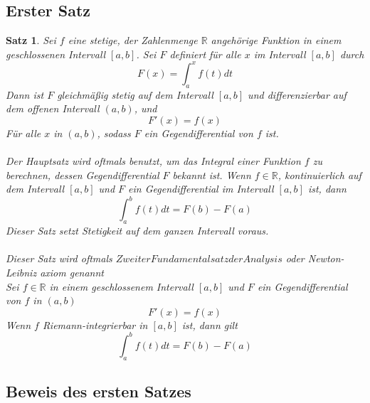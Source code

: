 \documentclass[fontsize=12pt,paper=a4,DIV12,cleardoublepage=empty, 
liststotoc,idxtotoc,bibtotoc]{article}
\newcommand{\RR}{\mathbb{R}}
\theoremstyle{plain}
\newtheorem{satz}{Satz}[subsection]
\theoremstyle{definition}
\begin{document}
	\subsection{Erster Satz}
	\begin{satz}
		Sei $f$ eine stetige, der Zahlenmenge $\RR$ angehörige Funktion in einem geschlossenen Intervall $[a, b]$. Sei $F$ definiert für alle $x$ im Intervall $[a, b]$ durch \\
			\begin{equation}
				F(x)=\int_{a}^{x}f(t) dt
			\end{equation}
		Dann ist $F$ gleichmäßig stetig auf dem Intervall $[a, b]$ und differenzierbar auf dem offenen Intervall $(a, b)$, und 
			\begin{equation}
				F'(x)=f(x)
			\end{equation}
		Für alle $x$ in $(a, b)$, sodass $F$ ein Gegendifferential von $f$ ist.\\\\

		Der Hauptsatz wird oftmals benutzt, um das Integral einer Funktion $f$ zu berechnen, dessen Gegendifferential $F$ bekannt ist. Wenn $f \in \RR$, kontinuierlich auf dem Intervall $[a, b]$ und $F$ ein Gegendifferential im Intervall $[a, b]$ ist, dann
		\begin{equation}
			\int_{a}^{b}f(t) dt=F(b)-F(a)
		\end{equation}
		Dieser Satz setzt Stetigkeit auf dem ganzen Intervall voraus.\\\\
	
	Dieser Satz wird oftmals $Zweiter Fundamentalsatz der Analysis$ oder Newton-Leibniz axiom genannt\\
	Sei $f \in \RR$ in einem geschlossenem Intervall $[a, b]$ und $F$ ein Gegendifferential von $f$ in $(a, b)$
	\begin{equation}
		F'(x)=f(x)
	\end{equation}
	Wenn $f$ Riemann-integrierbar in $[a, b]$ ist, dann gilt
	\begin{equation}
		\int_{a}^{b}f(t) dt = F(b)-F(a)
	\end{equation}
	\end{satz}
	
	
	\subsection{Beweis des ersten Satzes}
	
\end{document}
